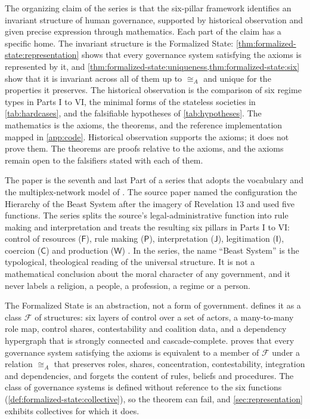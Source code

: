 \documentclass[11pt,letterpaper]{article}
\theoremstyle{definition}
\theoremstyle{remark}
\newcommand{\pF}{\mathsf{F}}
\newcommand{\pP}{\mathsf{P}}
\newcommand{\pJ}{\mathsf{J}}
\newcommand{\pI}{\mathsf{I}}
\newcommand{\pC}{\mathsf{C}}
\newcommand{\pW}{\mathsf{W}}
\begin{document}
The organizing claim of the series is that the six-pillar framework identifies an invariant structure of human governance, supported by historical observation and given precise expression through mathematics. Each part of the claim has a specific home. The invariant structure is the Formalized State: \cref{thm:formalized-state:representation} shows that every governance system satisfying the axioms is represented by it, and \cref{thm:formalized-state:uniqueness,thm:formalized-state:six} show that it is invariant across all of them up to $\cong_A$ and unique for the properties it preserves. The historical observation is the comparison of six regime types in Parts I to VI, the minimal forms of the stateless societies in \cref{tab:hardcases}, and the falsifiable hypotheses of \cref{tab:hypotheses}. The mathematics is the axioms, the theorems, and the reference implementation mapped in \cref{app:code}. Historical observation supports the axioms; it does not prove them. The theorems are proofs relative to the axioms, and the axioms remain open to the falsifiers stated with each of them.

The paper is the seventh and last Part of a series that adopts the vocabulary and the multiplex-network model of \citet{largo2026hbs}. The source paper named the configuration the Hierarchy of the Beast System after the imagery of Revelation 13 and used five functions. The series splits the source's legal-administrative function into rule making and interpretation and treats the resulting six pillars in Parts I to VI: control of resources ($\pF$), rule making ($\pP$), interpretation ($\pJ$), legitimation ($\pI$), coercion ($\pC$) and production ($\pW$) \citep{long2026financial,long2026political,long2026judicial,long2026ideological,long2026coercive,long2026productive}. In the series, the name ``Beast System'' is the typological, theological reading of the universal structure. It is not a mathematical conclusion about the moral character of any government, and it never labels a religion, a people, a profession, a regime or a person.

The Formalized State is an abstraction, not a form of government.  defines it as a class $\mathcal{F}$ of structures: six layers of control over a set of actors, a many-to-many role map, control shares, contestability and coalition data, and a dependency hypergraph that is strongly connected and cascade-complete.  proves that every governance system satisfying the axioms is equivalent to a member of $\mathcal{F}$ under a relation $\cong_A$ that preserves roles, shares, concentration, contestability, integration and dependencies, and forgets the content of rules, beliefs and procedures. The class of governance systems is defined without reference to the six functions (\cref{def:formalized-state:collective}), so the theorem can fail, and \cref{sec:representation} exhibits collectives for which it does.
\end{document}
